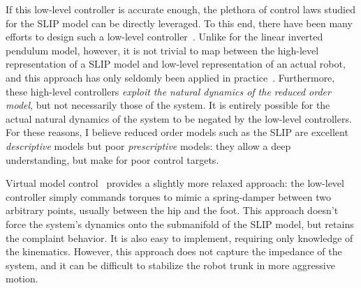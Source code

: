 If this low-level controller is accurate enough, the plethora of control laws studied for the SLIP model can be directly leveraged. To this end, there have been many efforts to design such a low-level controller~\cite{hutter2010slip,poulakakis2009spring,wensing2013high}. Unlike for the linear inverted pendulum model, however, it is not trivial to map between the high-level representation of a SLIP model and low-level representation of an actual robot, and this approach has only seldomly been applied in practice~\cite{martin2017experimental}.
Furthermore, these high-level controllers \emph{exploit the natural dynamics of the reduced order model}, but not necessarily those of the system. It is entirely possible for the actual natural dynamics of the system to be negated by the low-level controllers.
For these reasons, I believe reduced order models such as the SLIP are excellent \emph{descriptive} models but poor \emph{prescriptive} models: they allow a deep understanding, but make for poor control targets. \par
Virtual model control~\cite{pratt2001virtual,renjewski2015exciting} provides a slightly more relaxed approach: the low-level controller simply commands torques to mimic a spring-damper between two arbitrary points, usually between the hip and the foot. This approach doesn't force the system's dynamics onto the submanifold of the SLIP model, but retains the complaint behavior. It is also easy to implement, requiring only knowledge of the kinematics. However, this approach does not capture the impedance of the system, and it can be difficult to stabilize the robot trunk in more aggressive motion.

